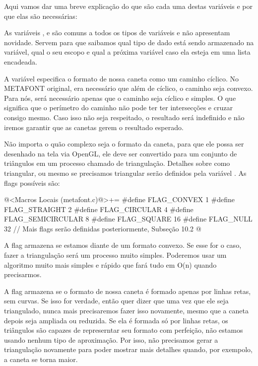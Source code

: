 Aqui vamos dar uma breve explicação do que são cada uma destas
variáveis e por que elas são necessárias:

As variáveis , 
e  são comuns a todos os tipos de variáveis e não
apresentam novidade. Servem para que saibamos qual tipo de dado está
sendo armazenado na variável, qual o seu escopo e qual a próxima
variável caso ela esteja em uma lista encadeada.

A variável  especifica o formato de nossa caneta
como um caminho cíclico. No METAFONT original, era necessário que além
de cíclico, o caminho seja convexo. Para nós, será necessário apenas
que o caminho seja cíclico e simples. O que significa que o perímetro
do caminho não pode ter ter intersecções e cruzar consigo mesmo. Caso
isso não seja respeitado, o resultado será indefinido e não iremos
garantir que as canetas gerem o resultado esperado.

Não importa o quão complexo seja o formato da caneta, para que ele
possa ser desenhado na tela via OpenGL, ele deve ser convertido para
um conjunto de triângulos em um processo chamado de
triangulação. Detalhes sobre como triangular, ou mesmo se precisamos
triangular serão definidos pela variável . As flags
possíveis são:

\iniciocodigo
@<Macros Locais (metafont.c)@>+=
#define FLAG_CONVEX        1
#define FLAG_STRAIGHT      2
#define FLAG_CIRCULAR      4
#define FLAG_SEMICIRCULAR  8
#define FLAG_SQUARE       16
#define FLAG_NULL         32
// Mais flags serão definidas posteriormente, Subseção 10.2
@
\fimcodigo


A flag  armazena se estamos diante de um
formato convexo. Se esse for o caso, fazer a triangulação será um
processo muito simples. Poderemos usar um algoritmo muito mais simples
e rápido que fará tudo em O(n) quando precisarmos.

A flag  armazena se o formato de nossa caneta
é formado apenas por linhas retas, sem curvas. Se isso for verdade,
então quer dizer que uma vez que ele seja triangulado, nunca mais
precisaremos fazer isso novamente, mesmo que a caneta depois seja
ampliada ou reduzida. Se ela é formada só por linhas retas, os
triângulos são capazes de represerntar seu formato com perfeição, não
estamos usando nenhum tipo de aproximação. Por isso, não precisamos
gerar a triangulação novamente para poder mostrar mais detalhes
quando, por exempolo, a caneta se torna maior.

